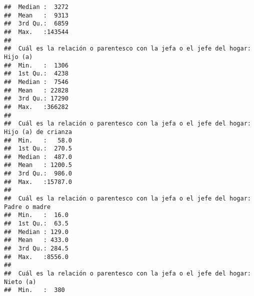 \documentclass[11pt,]{article}
\begin{document}
\begin{verbatim}
##  Median :  3272                                                                              
##  Mean   :  9313                                                                              
##  3rd Qu.:  6859                                                                              
##  Max.   :143544                                                                              
##                                                                                              
##  Cuál es la relación o parentesco con la jefa o el jefe del hogar: Hijo (a)
##  Min.   :  1306                                                            
##  1st Qu.:  4238                                                            
##  Median :  7546                                                            
##  Mean   : 22828                                                            
##  3rd Qu.: 17290                                                            
##  Max.   :366282                                                            
##                                                                            
##  Cuál es la relación o parentesco con la jefa o el jefe del hogar: Hijo (a) de crianza
##  Min.   :   58.0                                                                      
##  1st Qu.:  270.5                                                                      
##  Median :  487.0                                                                      
##  Mean   : 1200.5                                                                      
##  3rd Qu.:  986.0                                                                      
##  Max.   :15787.0                                                                      
##                                                                                       
##  Cuál es la relación o parentesco con la jefa o el jefe del hogar: Padre o madre
##  Min.   :  16.0                                                                 
##  1st Qu.:  63.5                                                                 
##  Median : 129.0                                                                 
##  Mean   : 433.0                                                                 
##  3rd Qu.: 284.5                                                                 
##  Max.   :8556.0                                                                 
##                                                                                 
##  Cuál es la relación o parentesco con la jefa o el jefe del hogar: Nieto (a)
##  Min.   :  380                                                              

\end{verbatim}
\end{document}
